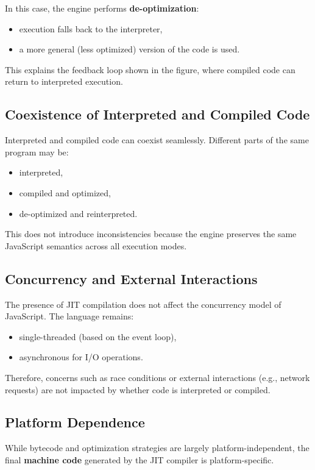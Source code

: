 \documentclass{scrbook}
\begin{document}
In this case, the engine performs \textbf{de-optimization}:
\begin{itemize}
    \item execution falls back to the interpreter,
    \item a more general (less optimized) version of the code is used.
\end{itemize}

This explains the feedback loop shown in the figure, where compiled code can return to interpreted execution.

\subsection{Coexistence of Interpreted and Compiled Code}

Interpreted and compiled code can coexist seamlessly. Different parts of the same program may be:
\begin{itemize}
    \item interpreted,
    \item compiled and optimized,
    \item de-optimized and reinterpreted.
\end{itemize}

This does not introduce inconsistencies because the engine preserves the same JavaScript semantics across all execution modes.

\subsection{Concurrency and External Interactions}

The presence of JIT compilation does not affect the concurrency model of JavaScript. The language remains:
\begin{itemize}
    \item single-threaded (based on the event loop),
    \item asynchronous for I/O operations.
\end{itemize}

Therefore, concerns such as race conditions or external interactions (e.g., network requests) are not impacted by whether code is interpreted or compiled.

\subsection{Platform Dependence}

While bytecode and optimization strategies are largely platform-independent, the final \textbf{machine code} generated by the JIT compiler is platform-specific.\\
\end{document}
